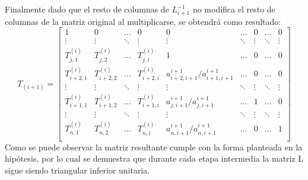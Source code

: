 Finalmente dado que el resto de columnas de $ L_{i+1}^{-1}$ no modifica el resto de columnas de la matriz original al multiplicarse, se obtendrá como resultado:\\
\[T_{(i+1)}=
\begin{bmatrix}
    1 &  0 & \dots & 0 & 0 & \dots &  0 & \dots & 0 \\
   \vdots  & \vdots & \ddots & \vdots & \vdots & \ddots & \vdots & \ddots & \vdots \\
   T_{j,1}^{(i)} &  T_{j,2}^{(i)} & \dots &  T_{j,i}^{(i)} & 1 & \dots  & 0 & \dots & 0 \\
   T_{i+2,1}^{(i)} &  T_{i+2,2}^{(i)} & \dots &  T_{i+2,i}^{(i)} & a_{i+2,i+1}^{i+1}/a_{i+1,i+1}^{i+1} & \dots  & 0 & \dots & 0 \\
   \vdots  & \vdots & \ddots & \vdots & \vdots & \ddots & \vdots & \ddots & \vdots \\
    T_{i+1,1}^{(i)} &  T_{i+1,2}^{(i)} & \dots &  T_{i+1,i}^{(i)} & a_{j,i+1}^{i+1}/a_{j,i+1}^{i+1} & \dots  & 1 & \dots & 0 \\
   \vdots  & \vdots & \ddots & \vdots & \vdots & \ddots & \vdots & \ddots & \vdots \\
    T_{n,1}^{(i)} &  T_{n,2}^{(i)} & \dots &  T_{n,i}^{(i)} &a_{n,i+1}^{i+1}/a_{n,i+1}^{i+1} & \dots & 0 & \dots & 1 \\
\end{bmatrix}
\]
Como se puede observar la matriz resultante cumple con la forma planteada en la hipótesis, por lo cual se demuestra que durante cada etapa intermedia la matriz L sigue siendo triangular inferior unitaria.
